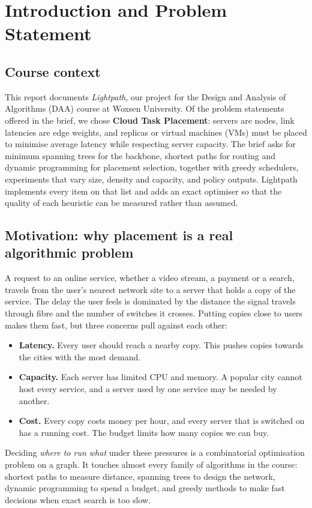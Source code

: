 \section{Introduction and Problem Statement}\label{sec:intro}

\subsection{Course context}
This report documents \emph{Lightpath}, our project for the Design and Analysis of Algorithms (DAA) course at Woxsen University. Of the problem statements offered in the brief, we chose \textbf{Cloud Task Placement}: servers are nodes, link latencies are edge weights, and replicas or virtual machines (VMs) must be placed to minimise average latency while respecting server capacity. The brief asks for minimum spanning trees for the backbone, shortest paths for routing and dynamic programming for placement selection, together with greedy schedulers, experiments that vary size, density and capacity, and policy outputs. Lightpath implements every item on that list and adds an exact optimiser so that the quality of each heuristic can be measured rather than assumed.

\subsection{Motivation: why placement is a real algorithmic problem}
A request to an online service, whether a video stream, a payment or a search, travels from the user's nearest network site to a server that holds a copy of the service. The delay the user feels is dominated by the distance the signal travels through fibre and the number of switches it crosses. Putting copies close to users makes them fast, but three concerns pull against each other:
\begin{itemize}[leftmargin=*]
  \item \textbf{Latency.} Every user should reach a nearby copy. This pushes copies towards the cities with the most demand.
  \item \textbf{Capacity.} Each server has limited CPU and memory. A popular city cannot host every service, and a server used by one service may be needed by another.
  \item \textbf{Cost.} Every copy costs money per hour, and every server that is switched on has a running cost. The budget limits how many copies we can buy.
\end{itemize}
Deciding \emph{where to run what} under these pressures is a combinatorial optimisation problem on a graph. It touches almost every family of algorithms in the course: shortest paths to measure distance, spanning trees to design the network, dynamic programming to spend a budget, and greedy methods to make fast decisions when exact search is too slow.

